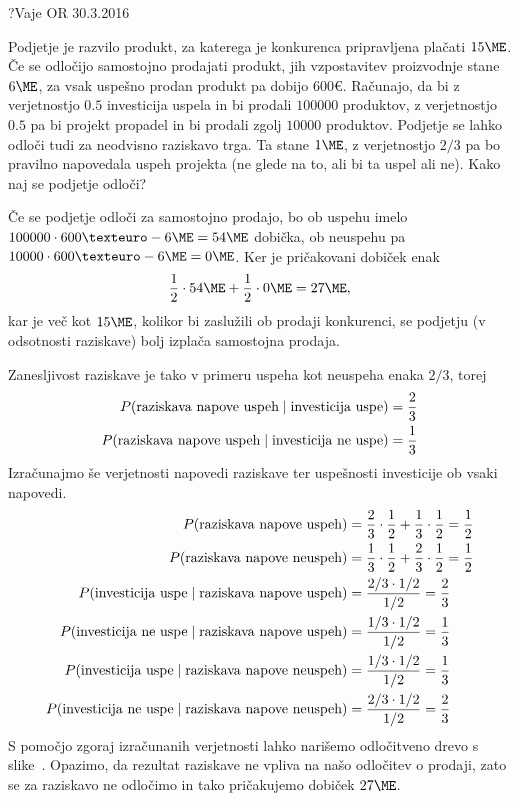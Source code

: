 \begin{naloga}{?}{Vaje OR 30.3.2016}
\begin{vprasanje}
Podjetje je razvilo produkt,
za katerega je konkurenca pripravljena plačati $15 \ME$.
Če se odločijo samostojno prodajati produkt,
jih vzpostavitev proizvodnje stane $6 \ME$,
za vsak uspešno prodan produkt pa dobijo $600 €$.
Računajo, da bi z ve\-rjet\-nost\-jo $0.5$ investicija uspela
in bi prodali $100000$ produktov,
z verjetnostjo $0.5$ pa bi projekt propadel
in bi prodali zgolj $10000$ produktov.
Podjetje se lahko odloči tudi za neodvisno raziskavo trga.
Ta stane $1 \ME$,
z verjetnostjo $2/3$ pa bo pravilno napovedala uspeh projekta
(ne glede na to, ali bi ta uspel ali ne).
Kako naj se podjetje odloči?
\end{vprasanje}

\begin{odgovor}
Če se podjetje odloči za samostojno prodajo,
bo ob uspehu imelo $100000 \cdot 600 € - 6 \ME = 54 \ME$ dobička,
ob neuspehu pa $10000 \cdot 600 € - 6 \ME = 0 \ME$.
Ker je pričakovani dobiček enak
$$
{1 \over 2} \cdot 54 \ME + {1 \over 2} \cdot 0 \ME = 27 \ME,
$$
kar je več kot $15 \ME$,
kolikor bi zaslužili ob prodaji konkurenci,
se podjetju (v odsotnosti raziskave) bolj izplača samostojna prodaja.

Zanesljivost raziskave je tako v primeru uspeha kot neuspeha enaka $2/3$,
torej
\begin{align*}
P(\text{raziskava napove uspeh} \;|\; \text{investicija uspe})
&= {2 \over 3} \\
P(\text{raziskava napove uspeh} \;|\; \text{investicija ne uspe})
&= {1 \over 3}
\end{align*}
Izračunajmo še verjetnosti napovedi raziskave
ter uspešnosti investicije ob vsaki napovedi.
\begin{align*}
P(\text{raziskava napove uspeh}) &=
{2 \over 3} \cdot {1 \over 2} + {1 \over 3} \cdot {1 \over 2} = {1 \over 2} \\
P(\text{raziskava napove neuspeh}) &=
{1 \over 3} \cdot {1 \over 2} + {2 \over 3} \cdot {1 \over 2} = {1 \over 2} \\
P(\text{investicija uspe} \;|\; \text{raziskava napove uspeh})
&= {2/3 \cdot 1/2 \over 1/2} = {2 \over 3} \\
P(\text{investicija ne uspe} \;|\; \text{raziskava napove uspeh})
&= {1/3 \cdot 1/2 \over 1/2} = {1 \over 3} \\
P(\text{investicija uspe} \;|\; \text{raziskava napove neuspeh})
&= {1/3 \cdot 1/2 \over 1/2} = {1 \over 3} \\
P(\text{investicija ne uspe} \;|\; \text{raziskava napove neuspeh})
&= {2/3 \cdot 1/2 \over 1/2} = {2 \over 3}
\end{align*}
S pomočjo zgoraj izračunanih verjetnosti
lahko narišemo odločitveno drevo s slike~\fig{}.
Opazimo, da rezultat raziskave ne vpliva na našo odločitev o prodaji,
zato se za raziskavo ne odločimo
in tako pričakujemo dobiček $27 \ME$.

\begin{slika}
\makebox[\textwidth][c]{
\pgfslika
}
\end{slika}
\end{odgovor}
\end{naloga}
